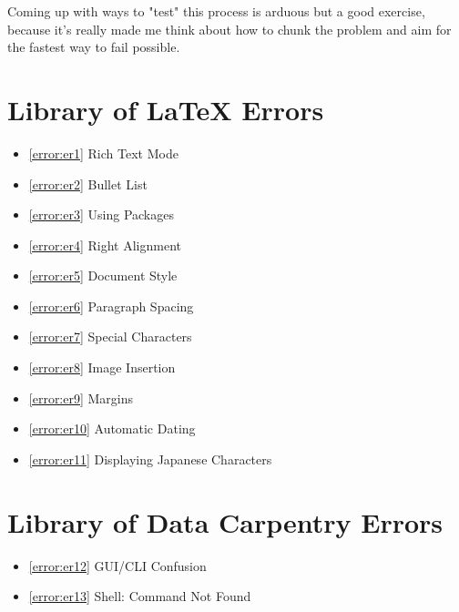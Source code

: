 \documentclass[12pt]{article}
\begin{document}
Coming up with ways to "test" this process is arduous but a good exercise, because it's really made me think about how to chunk the problem and aim for the fastest way to fail possible. 

\newpage\section{Library of LaTeX Errors}
\begin{itemize}
\renewcommand{\labelitemi}{$\nobullet$}
    \item \ref{error:er1} Rich Text Mode 
    \item \ref{error:er2} Bullet List 
    \item \ref{error:er3} Using Packages
    \item \ref{error:er4} Right Alignment
    \item \ref{error:er5} Document Style
    \item \ref{error:er6} Paragraph Spacing
    \item \ref{error:er7} Special Characters
    \item \ref{error:er8} Image Insertion
    \item \ref{error:er9} Margins
    \item \ref{error:er10} Automatic Dating
    \item \ref{error:er11} Displaying Japanese Characters
\end{itemize}


\section{Library of Data Carpentry Errors}
\begin{itemize}
\renewcommand{\labelitemi}{$\nobullet$}
    \item \ref{error:er12} GUI/CLI Confusion
    \item \ref{error:er13} Shell: Command Not Found
\end{itemize}
\end{document}
